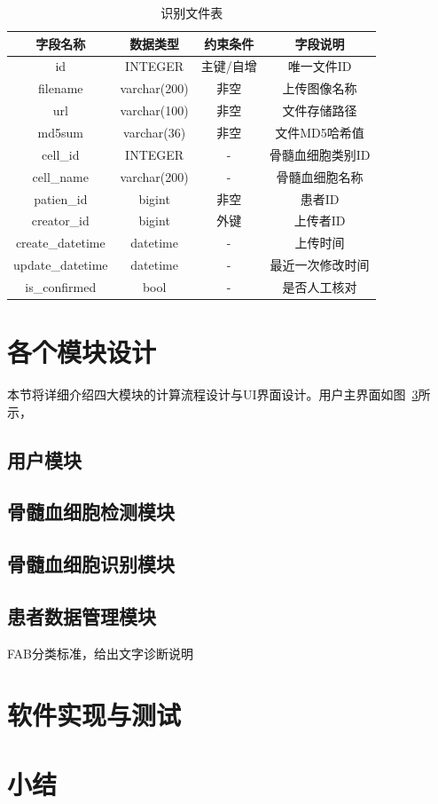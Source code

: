 \begin{table}
    \caption{识别文件表}   
    \centering 
    \label{table:recog_table}
    \begin{tabular*}{0.9\hsize}{@{}@{\extracolsep{\fill}}cccc@{}}
      \toprule[1pt]
      字段名称  &  数据类型 & 约束条件 & 字段说明 \\
      \midrule[1pt] 
      id           & INTEGER      & 主键/自增    & 唯一文件ID   \\ 
      filename     & varchar(200) & 非空         & 上传图像名称   \\ 
      url          & varchar(100) & 非空         & 文件存储路径   \\ 
      md5sum       & varchar(36)  & 非空         & 文件MD5哈希值 \\
      cell\_id      & INTEGER      & -            & 骨髓血细胞类别ID  \\
      cell\_name    & varchar(200) & -            & 骨髓血细胞名称  \\
      patien\_id   & bigint       & 非空         & 患者ID  \\ 
      creator\_id  & bigint       & 外键         & 上传者ID  \\ 
      create\_datetime & datetime & -    & 上传时间 \\
      update\_datetime & datetime & -    & 最近一次修改时间 \\
      is\_confirmed    & bool     & -    & 是否人工核对 \\
      \bottomrule[1pt]      
    \end{tabular*} 
  \end{table}

\section{各个模块设计}
本节将详细介绍四大模块的计算流程设计与UI界面设计。用户主界面如图~\ref{}所示，
\subsection{用户模块}
\subsection{骨髓血细胞检测模块}
\subsection{骨髓血细胞识别模块}
\subsection{患者数据管理模块}
FAB分类标准，给出文字诊断说明

\section{软件实现与测试}
\section{小结}